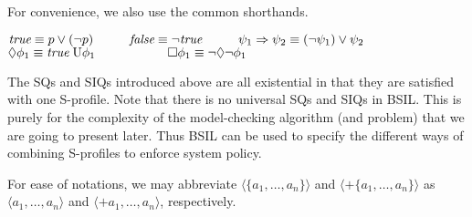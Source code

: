 For convenience, we also use the common shorthands.
\begin{center} 
$
\true
\equiv p\vee(\neg p) 
\hspace*{10mm} 
\false
\equiv \neg\true 
\hspace*{10mm} 
\psi_1\Rightarrow \psi_2
\equiv (\neg \psi_1)\vee \psi_2$ \\
$\pevt \phi_1
\equiv \true\;\until \phi_1 
\hspace*{20mm} 
\pfrr \phi_1
\equiv \neg\pevt\neg\phi_1 
$
\end{center} 
The SQs and SIQs introduced above are 
all existential in that they are satisfied with one S-profile.  
Note that there is no universal SQs and SIQs in BSIL.  
This is purely for the complexity of the model-checking algorithm (and problem)
that we are going to present later.  
Thus BSIL can be used to specify the different ways of combining S-profiles 
to enforce system policy.  

For ease of notations, 
we may abbreviate 
$\langle \{a_1,\ldots,a_n\}\rangle$ and  
$\langle+ \{a_1,\ldots,a_n\}\rangle$ as 
$\langle a_1,\ldots,a_n\rangle$ and  
$\langle+a_1,\ldots,a_n\rangle$, respectively.
